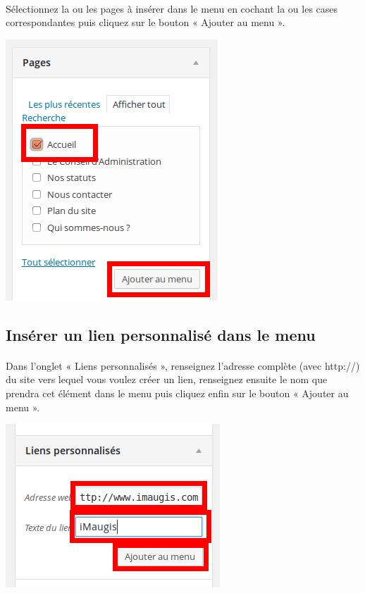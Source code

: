 \documentclass[10pt,a4paper]{article}
\begin{document}
\paragraph{}Sélectionnez la ou les pages à insérer dans le menu en cochant la ou les cases correspondantes puis cliquez sur le bouton « Ajouter au menu ».
\begin{center}
\includegraphics[scale=0.3]{img/0148.png}
\end{center}
\subsection{Insérer un lien personnalisé dans le menu}
\paragraph{}Dans l'onglet « Liens personnalisés », renseignez l'adresse complète (avec http://) du site vers lequel vous voulez créer un lien, renseignez ensuite le nom que prendra cet élément dans le menu puis cliquez enfin sur le bouton « Ajouter au menu ».
\begin{center}
\includegraphics[scale=0.3]{img/0149.png}
\end{center}
\end{document}
